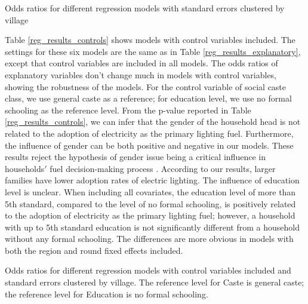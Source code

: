 \documentclass[11pt,english]{article}
\theoremstyle{plain} \newtheorem{claim}{Claim}
\theoremstyle{plain} \newtheorem{prop}{Proposition}
\theoremstyle{plain} \newtheorem{hypo}{Hypothesis}
\begin{document}
\begin{table}[ht!]
\centering
\resizebox{\columnwidth}{!}{%

%
}
\caption{Odds ratios for different regression models with standard errors clustered by village}
\label{reg_results_explanatory}
\end{table}


Table \ref{reg_results_controls} shows models with control variables included. The settings for these six models are the same as in Table \ref{reg_results_explanatory}, except that control variables are included in all models. The odds ratios of explanatory variables don't change much in models with control variables, showing the robustness of the models. For the control variable of social caste class, we use general caste as a reference; for education level, we use no formal schooling as the reference level. From the p-value reported in Table \ref{reg_results_controls}, we can infer that the gender of the household head is not related to the adoption of electricity as the primary lighting fuel. Furthermore, the influence of gender can be both positive and negative in our models. These results reject the hypothesis of gender issue being a critical influence in households$'$ fuel decision-making process \citep{Rahutetal2016}. According to our results, larger families have lower adoption rates of electric lighting. The influence of education level is unclear. When including all covariates, the education level of more than 5th standard, compared to the level of no formal schooling, is positively related to the adoption of electricity as the primary lighting fuel; however, a household with up to 5th standard education is not significantly different from a household without any formal schooling. The differences are more obvious in models with both the region and round fixed effects included.



\begin{table}[ht!]
\centering
\resizebox{\columnwidth}{!}{%

%
}
\caption{Odds ratios for different regression models with control variables included and standard errors clustered by village. The reference level for Caste is general caste; the reference level for Education is no formal schooling. }
\label{reg_results_controls}
\end{table}
\end{document}
